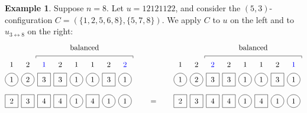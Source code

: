 \documentclass[reqno]{amsart}
\newcommand{\0}{\phantom{c}}
\theoremstyle{plain}
\theoremstyle{definition}
\newtheorem{example}[thm]{Example}
\numberwithin{equation}{section}
\begin{document}
\begin{example}
Suppose $n = 8$.
Let $u = 12121122$, and consider the $(5,3)$-configuration $C = (\{1,2,5,6,8\}, \{5,7,8\})$.
We apply $C$ to $u$ on the left and to $u_{3 \leftrightarrow 8}$ on the right:
\[
\begin{tikzpicture}[baseline=-3]
  \def\sc{0.75}   %
  \def\lll{1.7}   %
  \def\ll{1}   %
  \def\l{0}   %
  \node[color=blue] at (3*\sc,\lll) {$1$};
  \node[color=blue] at (8*\sc,\lll) {$2$};
  \foreach \i in {1,5,6} { \node at (\i*\sc,\lll) {$1$}; }
  \foreach \i in {2,4,7} { \node at (\i*\sc,\lll) {$2$}; }
  \foreach \i in {1,2,5,6,8} { \draw (\i*\sc,\ll) circle (0.3); }
  \foreach \i in {3,4,7} { \draw (\i*\sc-.3,\ll-.3) rectangle +(0.6,+0.6); }
  \foreach \i in {1,5,6,8} { \node at (\i*\sc,\ll) {$1$}; }
  \foreach \i in {2} { \node at (\i*\sc,\ll) {$2$}; }
  \foreach \i in {3,4,7} { \node at (\i*\sc,\ll) {$3$}; }
  \foreach \i in {5,7,8} { \draw (\i*\sc,\l) circle (0.3); }
  \foreach \i in {1,2,3,4,6} { \draw (\i*\sc-.3,\l-.3) rectangle +(0.6,+0.6); }
  \foreach \i in {3,4,6} { \node at (\i*\sc,\l) {$4$}; }
  \foreach \i in {2} { \node at (\i*\sc,\l) {$3$}; }
  \foreach \i in {1} { \node at (\i*\sc,\l) {$2$}; }
  \foreach \i in {5,7,8} { \node at (\i*\sc,\l) {$1$}; }
  \draw (2.5*\sc,2) -- (2.5*\sc,2.1) -- (8.5*\sc,2.1) -- (8.5*\sc,2);
  \node at (5.5*\sc,2.5) {balanced};
\end{tikzpicture}
\hspace{20pt} = \hspace{20pt}
\begin{tikzpicture}[baseline=-3]
  \def\sc{0.75}   %
  \def\lll{1.7}   %
  \def\ll{1}   %
  \def\l{0}   %
  \node[color=blue] at (8*\sc,\lll) {$1$};
  \node[color=blue] at (3*\sc,\lll) {$2$};
  \foreach \i in {1,5,6} { \node at (\i*\sc,\lll) {$1$}; }
  \foreach \i in {2,4,7} { \node at (\i*\sc,\lll) {$2$}; }
  \foreach \i in {1,2,5,6,8} { \draw (\i*\sc,\ll) circle (0.3); }
  \foreach \i in {3,4,7} { \draw (\i*\sc-.3,\ll-.3) rectangle +(0.6,+0.6); }
  \foreach \i in {1,5,6,8} { \node at (\i*\sc,\ll) {$1$}; }
  \foreach \i in {3,4,7} { \node at (\i*\sc,\ll) {$3$}; }
  \foreach \i in {2} { \node at (\i*\sc,\ll) {$2$}; }
  \foreach \i in {5,7,8} { \draw (\i*\sc,\l) circle (0.3); }
  \foreach \i in {1,2,3,4,6} { \draw (\i*\sc-.3,\l-.3) rectangle +(0.6,+0.6); }
  \foreach \i in {3,4,6} { \node at (\i*\sc,\l) {$4$}; }
  \foreach \i in {2} { \node at (\i*\sc,\l) {$3$}; }
  \foreach \i in {1} { \node at (\i*\sc,\l) {$2$}; }
  \foreach \i in {5,7,8} { \node at (\i*\sc,\l) {$1$}; }
  \draw (2.5*\sc,2) -- (2.5*\sc,2.1) -- (8.5*\sc,2.1) -- (8.5*\sc,2);
  \node at (5.5*\sc,2.5) {balanced};
\end{tikzpicture}
\]
\end{example}
\end{document}
